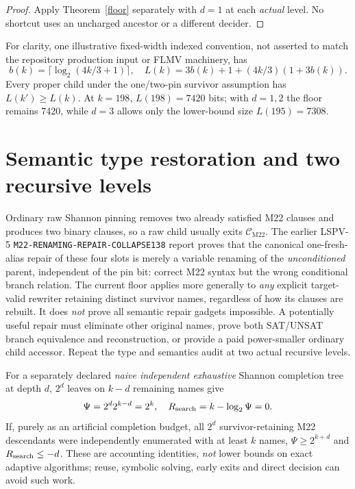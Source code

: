 \documentclass[11pt]{article}
\newcommand{\CM}{\mathcal C_{\mathrm{M22}}}
\begin{document}
\begin{proof}
Apply Theorem~\ref{floor} separately with \(d=1\) at each \emph{actual} level. No shortcut uses an uncharged ancestor or a different decider.
\end{proof}
For clarity, one illustrative fixed-width indexed convention, not asserted to match the repository production input or FLMV machinery, has
\[
b(k)=\lceil\log_2(4k/3+1)\rceil,\quad
L(k)=3b(k)+1+(4k/3)(1+3b(k)).
\]
Every proper child under the one/two-pin survivor assumption has \(L(k')\ge L(k)\). At \(k=198\), \(L(198)=7420\) bits; with \(d=1,2\) the floor remains 7420, while \(d=3\) allows only the lower-bound size \(L(195)=7308\).

\section{Semantic type restoration and two recursive levels}
Ordinary raw Shannon pinning removes two already satisfied M22 clauses and produces two binary clauses, so a raw child usually exits \(\CM\). The earlier LSPV-5 \texttt{M22-RENAMING-REPAIR-COLLAPSE138} report proves that the canonical one-fresh-alias repair of these four slots is merely a variable renaming of the \emph{unconditioned} parent, independent of the pin bit: correct M22 syntax but the wrong conditional branch relation. The current floor applies more generally to \emph{any} explicit target-valid rewriter retaining distinct survivor names, regardless of how its clauses are rebuilt. It does \emph{not} prove all semantic repair gadgets impossible. A potentially useful repair must eliminate other original names, prove both SAT/UNSAT branch equivalence and reconstruction, or provide a paid power-smaller ordinary child accessor. Repeat the type and semantics audit at two actual recursive levels.

For a separately declared \emph{naive independent exhaustive} Shannon completion tree at depth \(d\), \(2^d\) leaves on \(k-d\) remaining names give
\[
\Psi=2^d2^{k-d}=2^k,\quad R_{\rm search}=k-\log_2\Psi=0.
\]
If, purely as an artificial completion budget, all \(2^d\) survivor-retaining M22 descendants were independently enumerated with at least \(k\) names, \(\Psi\ge2^{k+d}\) and \(R_{\rm search}\le-d\). These are accounting identities, \emph{not} lower bounds on exact adaptive algorithms; reuse, symbolic solving, early exits and direct decision can avoid such work.
\end{document}

